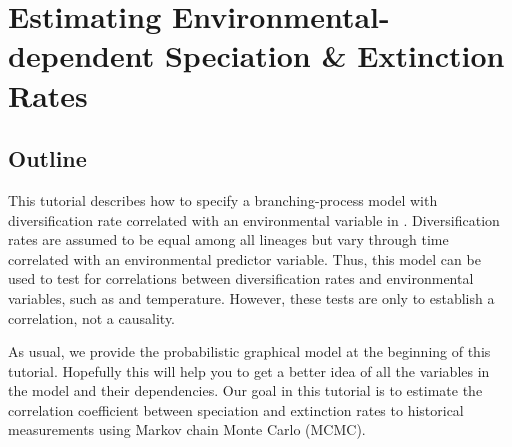 \section{Estimating Environmental-dependent Speciation \& Extinction Rates}

\subsection{Outline}

This tutorial describes how to specify a branching-process model with diversification rate correlated with an environmental variable in \RevBayes.
Diversification rates are assumed to be equal among all lineages but vary through time correlated with an environmental predictor variable.
Thus, this model can be used to test for correlations between diversification rates and environmental variables, such as \COO and temperature.
However, these tests are only to establish a correlation, not a causality.

As usual, we provide the probabilistic graphical model at the beginning of this tutorial.
Hopefully this will help you to get a better idea of all the variables in the model and their dependencies.
Our goal in this tutorial is to estimate the correlation coefficient between speciation and extinction rates to historical \COO measurements using Markov chain Monte Carlo (MCMC).



